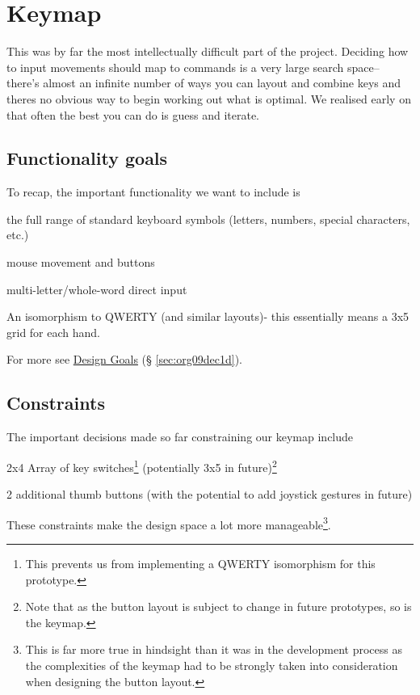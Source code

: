 \documentclass[logo,bsc,singlespacing,parskip]{infthesis}
\begin{document}
\section{Keymap}
\label{sec:org21c0d35}
This was by far the most intellectually difficult part of the project.
Deciding how to input movements should map to commands is a very large search space-- there's almost an infinite number of ways you can layout and combine keys and theres no obvious way to begin working out what is optimal.
We realised early on that often the best you can do is guess and iterate.

\subsection{Functionality goals}
\label{sec:orgc152068}
To recap, the important functionality we want to include is
\begin{enumerate*}[label={\arabic*)}, itemjoin={, \,}, itemjoin*={, and \,}]
\item the full range of standard keyboard symbols (letters, numbers, special characters, etc.)
\item mouse movement and buttons
\item multi-letter/whole-word direct input
\item An isomorphism to QWERTY (and similar layouts)- this essentially means a 3x5 grid for each hand.
\end{enumerate*}
For more see \hyperref[sec:org09dec1d]{Design Goals} (§ \ref{sec:org09dec1d}).

\subsection{Constraints}
\label{sec:org463919c}
The important decisions made so far constraining our keymap include
\begin{enumerate*}[label={\arabic*)}, itemjoin={, \,}, itemjoin*={, and \,}]
\item 2x4 Array of key switches\footnote{This prevents us from implementing a QWERTY isomorphism for this prototype.} (potentially 3x5 in future)\footnote{Note that as the button layout is subject to change in future prototypes, so is the keymap.}
\item 2 additional thumb buttons (with the potential to add joystick gestures in future)
\end{enumerate*}
These constraints make the design space a lot more manageable\footnote{This is far more true in hindsight than it was in the development process as the complexities of the keymap had to be strongly taken into consideration when designing the button layout.}.
\end{document}
